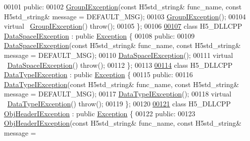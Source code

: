 \begin{DoxyCode}
00101    \textcolor{keyword}{public}:
00102         \hyperlink{class_h5_1_1_group_i_exception}{GroupIException}(\textcolor{keyword}{const} H5std\_string& func\_name, \textcolor{keyword}{const} H5std\_string& message = 
      DEFAULT\_MSG);
00103         \hyperlink{class_h5_1_1_group_i_exception}{GroupIException}();
00104         \textcolor{keyword}{virtual} ~\hyperlink{class_h5_1_1_group_i_exception}{GroupIException}() \textcolor{keywordflow}{throw}();
00105 \};
00106 
\hyperlink{class_h5_1_1_data_space_i_exception}{00107} \textcolor{keyword}{class }H5\_DLLCPP \hyperlink{class_h5_1_1_data_space_i_exception}{DataSpaceIException} : \textcolor{keyword}{public} \hyperlink{class_h5_1_1_exception}{Exception} \{
00108    \textcolor{keyword}{public}:
00109         \hyperlink{class_h5_1_1_data_space_i_exception}{DataSpaceIException}(\textcolor{keyword}{const} H5std\_string& func\_name, \textcolor{keyword}{const} H5std\_string& message =
       DEFAULT\_MSG);
00110         \hyperlink{class_h5_1_1_data_space_i_exception}{DataSpaceIException}();
00111         \textcolor{keyword}{virtual} ~\hyperlink{class_h5_1_1_data_space_i_exception}{DataSpaceIException}() \textcolor{keywordflow}{throw}();
00112 \};
00113 
\hyperlink{class_h5_1_1_data_type_i_exception}{00114} \textcolor{keyword}{class }H5\_DLLCPP \hyperlink{class_h5_1_1_data_type_i_exception}{DataTypeIException} : \textcolor{keyword}{public} \hyperlink{class_h5_1_1_exception}{Exception} \{
00115    \textcolor{keyword}{public}:
00116         \hyperlink{class_h5_1_1_data_type_i_exception}{DataTypeIException}(\textcolor{keyword}{const} H5std\_string& func\_name, \textcolor{keyword}{const} H5std\_string& message = 
      DEFAULT\_MSG);
00117         \hyperlink{class_h5_1_1_data_type_i_exception}{DataTypeIException}();
00118         \textcolor{keyword}{virtual} ~\hyperlink{class_h5_1_1_data_type_i_exception}{DataTypeIException}() \textcolor{keywordflow}{throw}();
00119 \};
00120 
\hyperlink{class_h5_1_1_obj_header_i_exception}{00121} \textcolor{keyword}{class }H5\_DLLCPP \hyperlink{class_h5_1_1_obj_header_i_exception}{ObjHeaderIException} : \textcolor{keyword}{public} \hyperlink{class_h5_1_1_exception}{Exception} \{
00122    \textcolor{keyword}{public}:
00123         \hyperlink{class_h5_1_1_obj_header_i_exception}{ObjHeaderIException}(\textcolor{keyword}{const} H5std\_string& func\_name, \textcolor{keyword}{const} H5std\_string& message =

\end{DoxyCode}
